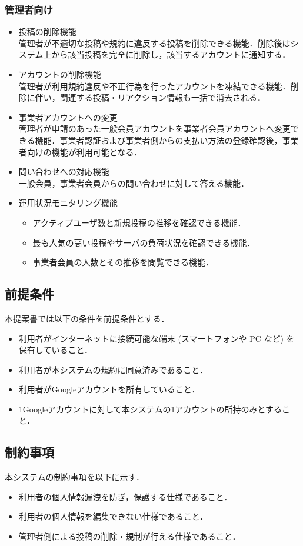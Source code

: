 \subsubsection{管理者向け}
\begin{itemize}[itemsep=10pt]
    \item 投稿の削除機能 \mbox{}\\
    管理者が不適切な投稿や規約に違反する投稿を削除できる機能．削除後はシステム上から該当投稿を完全に削除し，該当するアカウントに通知する．
    \item アカウントの削除機能 \mbox{}\\
    管理者が利用規約違反や不正行為を行ったアカウントを凍結できる機能．削除に伴い，関連する投稿・リアクション情報も一括で消去される．
    \item 事業者アカウントへの変更 \mbox{}\\
    管理者が申請のあった一般会員アカウントを事業者会員アカウントへ変更できる機能．事業者認証および事業者側からの支払い方法の登録確認後，事業者向けの機能が利用可能となる．
    \item 問い合わせへの対応機能 \mbox{} \\
    一般会員，事業者会員からの問い合わせに対して答える機能．
    \item 運用状況モニタリング機能 \mbox{}
    \begin{itemize}
        \item アクティブユーザ数と新規投稿の推移を確認できる機能．
        \item 最も人気の高い投稿やサーバの負荷状況を確認できる機能．
        \item 事業者会員の人数とその推移を閲覧できる機能．
    \end{itemize}
\end{itemize}

\subsection{前提条件}
本提案書では以下の条件を前提条件とする．
\begin{itemize}
    \item 利用者がインターネットに接続可能な端末 (スマートフォンや PC など) を保有していること．
    \item 利用者が本システムの規約に同意済みであること．
    \item 利用者がGoogleアカウントを所有していること．
    \item 1Googleアカウントに対して本システムの1アカウントの所持のみとすること．
\end{itemize}

\subsection{制約事項}
本システムの制約事項を以下に示す．
\begin{itemize}
    \item 利用者の個人情報漏洩を防ぎ，保護する仕様であること．
    \item 利用者の個人情報を編集できない仕様であること．
    \item 管理者側による投稿の削除・規制が行える仕様であること．
\end{itemize}